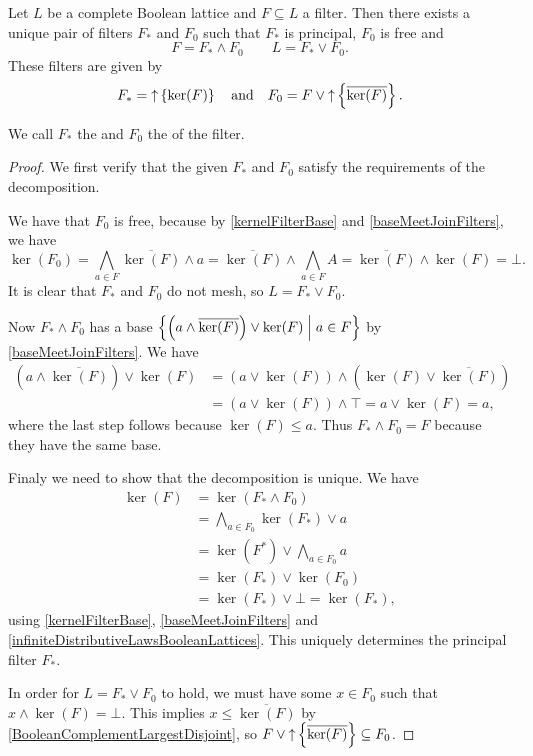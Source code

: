 \begin{proposition} \label{freePrincipalDecomposition}
Let $L$ be a complete Boolean lattice and $F\subseteq L$ a filter. Then there exists a unique pair of filters $F_*$ and $F_0$ such that $F_*$ is principal, $F_0$ is free and
\[ F = F_* \wedge F_0 \qquad L = F_* \vee F_0. \]
These filters are given by
\[ F_* = \operatorname{\uparrow}\left\{\ker(F)\right\} \quad\text{and}\quad F_0 = F\vee \operatorname{\uparrow}\left\{\overline{\ker(F)}\right\}.  \]
\end{proposition}
We call $F_*$ the  and $F_0$ the  of the filter.
\begin{proof}
We first verify that the given $F_*$ and $F_0$ satisfy the requirements of the decomposition.

We have that $F_0$ is free, because by \ref{kernelFilterBase} and \ref{baseMeetJoinFilters}, we have
\[ \ker(F_0) = \bigwedge_{a\in F} \overline{\ker(F)}\wedge a = \overline{\ker(F)}\wedge \bigwedge_{a\in F} A = \overline{\ker(F)}\wedge \ker(F) = \bot. \]
It is clear that $F_*$ and $F_0$ do not mesh, so $L = F_* \vee F_0$.

Now $F_* \wedge F_0$ has a base $\setbuilder{\left(a\wedge \overline{\ker(F)}\right)\vee \ker(F)}{a\in F}$ by \ref{baseMeetJoinFilters}. We have
\begin{align*}
\left(a\wedge \overline{\ker(F)}\right)\vee \ker(F) &= \left(a\vee \ker(F)\right)\wedge \left(\ker(F) \vee \overline{\ker(F)}\right) \\
&= \left(a\vee \ker(F)\right)\wedge \top = a\vee \ker(F) = a,
\end{align*}
where the last step follows because $\ker(F)\leq a$. Thus $F_* \wedge F_0 = F$ because they have the same base.

Finaly we need to show that the decomposition is unique. We have
\begin{align*}
\ker(F) &= \ker(F_* \wedge F_0) \\
&= \bigwedge_{a\in F_0} \ker(F_*) \vee a \\
&= \ker(F^*) \vee \bigwedge_{a\in F_0}a \\
&= \ker(F_*)\vee \ker(F_0) \\
&= \ker(F_*)\vee \bot = \ker(F_*),
\end{align*}
using \ref{kernelFilterBase}, \ref{baseMeetJoinFilters} and \ref{infiniteDistributiveLawsBooleanLattices}. This uniquely determines the principal filter $F_*$.

In order for $L = F_* \vee F_0$ to hold, we must have some $x\in F_0$ such that $x\wedge \ker(F) = \bot$. This implies $x\leq \overline{\ker(F)}$ by \ref{BooleanComplementLargestDisjoint}, so $F\vee \operatorname{\uparrow}\left\{\overline{\ker(F)}\right\} \subseteq F_0$.


\end{proof}
